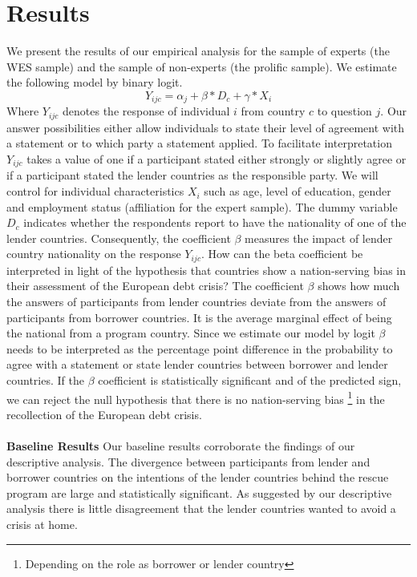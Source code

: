 \clearpage
\section{Results}
We present the results of our empirical analysis for the sample of experts (the WES sample) and the sample of non-experts (the prolific sample).  We estimate the following model by binary logit. 
\begin{equation*}
    Y_{ijc}= \alpha_{j}+ \beta *D_{c} + \gamma*X_{i}
\end{equation*}
Where $Y_{ijc}$ denotes the response of individual $i$ from country $c$ to question $j$. Our answer possibilities either allow individuals to state their level of agreement with a statement or to which party a statement applied. To facilitate interpretation  $Y_{ijc}$ takes a value of one if a participant stated either strongly or slightly agree or if a participant stated the lender countries as the responsible party. We will control for individual characteristics $X_{i}$ such as age, level of education, gender and employment status (affiliation for the expert sample). The dummy variable $D_{c}$ indicates whether the respondents report to have the nationality of one of the lender countries. Consequently, the coefficient $\beta$ measures the impact of lender country nationality on the response $Y_{ijc}$. How can the beta coefficient be interpreted in light of the hypothesis that countries show a nation-serving bias in their assessment of the European debt crisis?  The coefficient $\beta$ shows how much the answers of participants from lender countries deviate from the answers of participants from borrower countries. It is the average marginal effect of being the national from a program country. Since we estimate our model by logit $\beta$ needs to be interpreted as the percentage point difference  in the probability to agree with a statement or state lender countries between borrower and lender countries. If the $\beta$ coefficient is statistically significant and of the predicted sign, we can reject the null hypothesis that there is no nation-serving bias \footnote{Depending on the role as borrower or lender country} in the recollection of the European debt crisis. 
\\ \\
\textbf{Baseline Results} 
Our baseline results corroborate the findings of our descriptive analysis. The divergence between participants from lender and borrower countries on the intentions of the lender countries behind the rescue program are large and statistically significant. As suggested by our descriptive analysis there is little disagreement that the lender countries wanted to avoid a crisis at home.  \\ 
